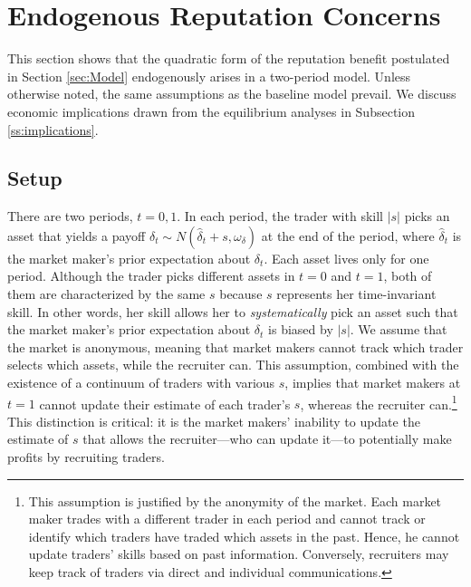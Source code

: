 \section{Endogenous Reputation Concerns} \label{sec:endogenous}
This section shows that the quadratic form of the reputation benefit postulated in Section \ref{sec:Model} endogenously arises in a two-period model. Unless otherwise noted, the same assumptions as the baseline model prevail. We discuss economic implications drawn from the equilibrium analyses in Subsection \ref{ss:implications}.

\subsection{Setup} \label{sec:setupEndog}
There are two periods, $t=0,1$. In each period, the trader with skill $|s|$ picks an asset that yields a payoff $\delta_{t}\sim N(\hat{\delta}_{t}+s,\omega_{\delta})$ at the end of the period, where $\hat{\delta}_{t}$ is the market maker's prior expectation about $\delta_{t}$. Each asset lives only for one period. Although the trader picks different assets in $t=0$ and $t=1$, both of them are characterized by the same $s$ because $s$ represents her time-invariant skill. In other words, her skill allows her to {\it systematically} pick an asset such that the market maker's prior expectation about $\delta_{t}$ is biased by $|s|$. %
We assume that the market is anonymous, meaning that market makers cannot track which trader selects which assets, while the recruiter can. This assumption, combined with the existence of a continuum of traders with various $s$, implies that market makers at $t=1$ cannot update their estimate of each trader’s $s$, whereas the recruiter can.\footnote{This assumption is justified by the anonymity of the market. Each market maker trades with a different trader in each period and cannot track or identify which traders have traded which assets in the past. Hence, he cannot update traders' skills based on past information. Conversely, recruiters may keep track of traders via direct and individual communications.} This distinction is critical: it is the market makers' inability to update the estimate of $s$ that allows the recruiter---who can update it---to potentially make profits by recruiting traders.

